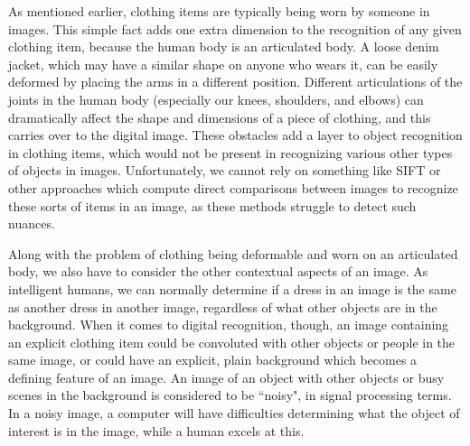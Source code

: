 \documentclass[12pt]{report} %
\begin{document}
	As mentioned earlier, clothing items are typically being worn by someone in images. This simple fact adds one extra dimension to the recognition of any given clothing item, because the human body is an articulated body. A loose denim jacket, which may have a similar shape on anyone who wears it, can be easily deformed by placing the arms in a different position. Different articulations of the joints in the human body (especially our knees, shoulders, and elbows) can dramatically affect the shape and dimensions of a piece of clothing, and this carries over to the digital image. These obstacles add a layer to object recognition in clothing items, which would not be present in recognizing various other types of objects in images. Unfortunately, we cannot rely on something like SIFT\cite{lowe1999object} or other approaches which compute direct comparisons between images to recognize these sorts of items in an image, as these methods struggle to detect such nuances. 


	Along with the problem of clothing being deformable and worn on an articulated body, we also have to consider the other contextual aspects of an image. As intelligent humans, we can normally determine if a dress in an image is the same as another dress in another image, regardless of what other objects are in the background. When it comes to digital recognition, though, an image containing an explicit clothing item could be convoluted with other objects or people in the same image, or could have an explicit, plain background which becomes a defining feature of an image. An image of an object with other objects or busy scenes in the background is considered to be ``noisy", in signal processing terms. In a noisy image, a computer will have difficulties determining what the object of interest is in the image, while a human excels at this.
	
\end{document}

